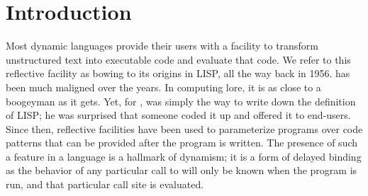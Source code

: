 \documentclass[acmsmall, screen]{acmart}
\begin{document}
\maketitle
\renewcommand{\shortauthors}{Goel et al.}
\renewcommand{\shorttitle}{What We Eval in the Shadows}

\section{Introduction}

Most dynamic languages provide their users with a facility to transform
unstructured text into executable code and evaluate that code. We refer to this
reflective facility as \eval bowing to its origins in LISP, all the way back in
1956. \Eval has been much maligned over the years. In computing lore, it is as
close to a boogeyman as it gets. Yet, for \citet{lisp}, \eval was simply the way to
write down the definition of LISP; he was surprised that someone coded it up and
offered it to end-users. Since then, reflective facilities have been
used to parameterize programs over code patterns that can be provided after the
program is written. The presence of such a feature in a language is a hallmark
of dynamism; it is a form of delayed binding as the behavior of any particular
call to \eval will only be known when the program is run, and that particular
call site is evaluated.
\end{document}
